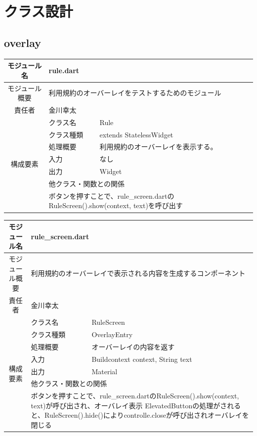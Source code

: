 \section{クラス設計}\label{sec:dart-class}

\subsection*{overlay}
\begin{table}[H]
  \centering
  \begin{tabular}{|c|l|l|} \hline
    モジュール名 & \multicolumn{2}{l|}{rule.dart}  \\ \hline
    モジュール概要 & \multicolumn{2}{p{12cm}|}{利用規約のオーバーレイをテストするためのモジュール}           \\ \hline
    責任者 & \multicolumn{2}{l|}{金川幸太}           \\ \hline
    \multirow{7}{*}{構成要素}       & クラス名 & Rule      \\ \cline{2-3}
      & クラス種類 & extends StatelessWidget \\ \cline{2-3}
      & 処理概要 & 利用規約のオーバーレイを表示する。 \\ \cline{2-3}
      & 入力 & なし \\ \cline{2-3}
      & 出力 & Widget \\ \cline{2-3}
      & \multicolumn{2}{l|}{他クラス・関数との関係}  \\ \cline{2-3}
      & \multicolumn{2}{p{12cm}|}{ボタンを押すことで、rule\_screen.dartのRuleScreen().show(context, text)を呼び出す}  \\ \hline
  \end{tabular}
\end{table}

\begin{table}[H]
  \centering
  \begin{tabular}{|c|l|l|} \hline
    モジュール名 & \multicolumn{2}{l|}{rule\_screen.dart}  \\ \hline
    モジュール概要 & \multicolumn{2}{p{12cm}|}{利用規約のオーバーレイで表示される内容を生成するコンポーネント} \\ \hline
    責任者 & \multicolumn{2}{l|}{金川幸太} \\ \hline
    \multirow{7}{*}{構成要素} & クラス名 & RuleScreen      \\ \cline{2-3}
      & クラス種類 & OverlayEntry \\ \cline{2-3}
      & 処理概要 & オーバーレイの内容を返す \\ \cline{2-3}
      & 入力 & Buildcontext context, String text \\ \cline{2-3}
      & 出力 & Material \\ \cline{2-3}
      & \multicolumn{2}{l|}{他クラス・関数との関係}  \\ \cline{2-3}
      & \multicolumn{2}{p{12cm}|}{ボタンを押すことで、rule\_screen.dartのRuleScreen().show(context, text)が呼び出され、オーバレイ表示
      ElevatedButtonの処理がされると、RuleScreen().hide()によりcontrolle.closeが呼び出されオーバレイを閉じる}  \\ \hline
  \end{tabular}
\end{table}

